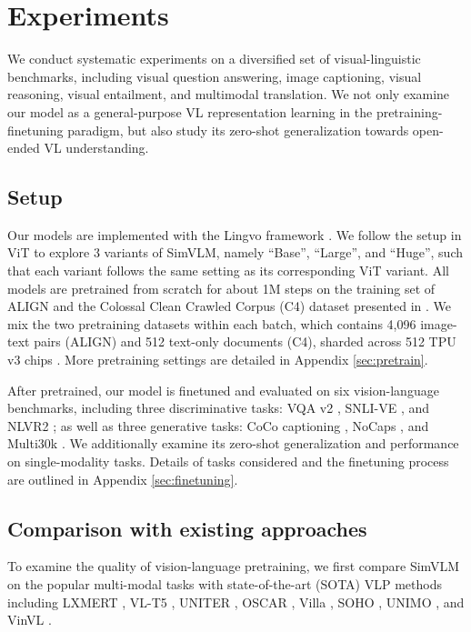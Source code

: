 \section{Experiments}

We conduct systematic experiments on a diversified set of visual-linguistic benchmarks, including visual question answering, image captioning, visual reasoning, visual entailment, and multimodal translation. We not only examine our model as a general-purpose VL representation learning in the pretraining-finetuning paradigm, but also study its zero-shot generalization towards open-ended VL understanding.

\subsection{Setup}

Our models are implemented with the Lingvo framework \citep{shen2019lingvo}. We follow the setup in ViT \citep{dosovitskiy2021an} to explore 3 variants of SimVLM, namely ``Base'', ``Large'', and ``Huge'', such that each variant follows the same setting as its corresponding ViT variant. All models are pretrained from scratch for about 1M steps on the training set of ALIGN \citep{jia2021scaling} and the Colossal Clean Crawled Corpus (C4) dataset presented in \citet{raffel2019exploring}.
We mix the two pretraining datasets within each batch, which contains 4,096 image-text pairs (ALIGN) and 512 text-only documents (C4), sharded across 512 TPU v3 chips \citep{jouppi2017indatacenter}. More pretraining settings are detailed in Appendix \ref{sec:pretrain}.

After pretrained, our model is finetuned and evaluated on six vision-language benchmarks, including three discriminative tasks: VQA v2 \citep{goyal2017making}, SNLI-VE \citep{xie2019visual}, and NLVR2 \citep{suhr2018corpus}; as well as three generative tasks: CoCo captioning \citep{chen2015microsoft}, NoCaps \citep{agrawal2019nocaps}, and Multi30k \citep{elliott2016multi30k}. We additionally examine its zero-shot generalization and performance on single-modality tasks. Details of tasks considered and the finetuning process are outlined in Appendix \ref{sec:finetuning}.

\subsection{Comparison with existing approaches} To examine the quality of vision-language pretraining, we first compare {SimVLM} on the popular multi-modal tasks with state-of-the-art (SOTA) VLP methods including LXMERT \citep{tan-bansal-2019-lxmert}, VL-T5 \citep{cho2021unifying}, UNITER \citep{chen2020uniter}, OSCAR \citep{li2020oscar}, Villa \citep{gan2020large}, SOHO \citep{huang2021seeing}, UNIMO \citep{li-etal-2021-unimo}, and VinVL \citep{Zhang_2021_CVPR}.

